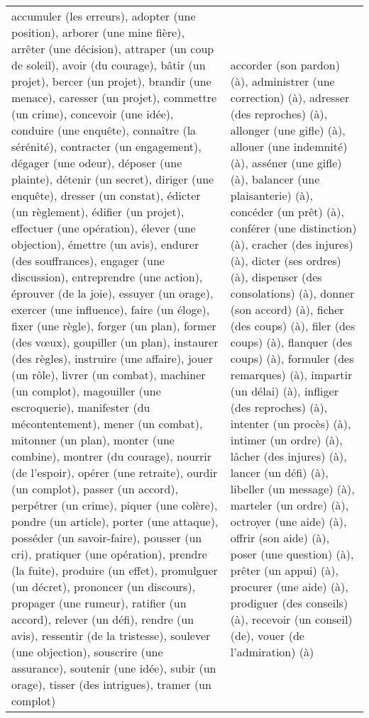 \documentclass[UTF8]{report}
\begin{document}
\begin{table}[H]
\begin{adjustbox}{max width = \textwidth}
\begin{tabular}{|>{\raggedright\arraybackslash}p{}|>{\raggedright\arraybackslash}p{}|}
            accumuler (les erreurs), adopter (une position), arborer (une mine fière), arrêter (une décision), attraper (un coup de soleil), avoir (du courage), bâtir (un projet), bercer (un projet), brandir (une menace), caresser (un projet), commettre (un crime), concevoir (une idée), conduire (une enquête), connaître (la sérénité), contracter (un engagement), dégager (une odeur), déposer (une plainte), détenir (un secret), diriger (une enquête), dresser (un constat), édicter (un règlement), édifier (un projet), effectuer (une opération), élever (une objection), émettre (un avis), endurer (des souffrances), engager (une discussion), entreprendre (une action), éprouver (de la joie), essuyer (un orage), exercer (une influence), faire (un éloge), fixer (une règle), forger (un plan), former (des vœux), goupiller (un plan), instaurer (des règles), instruire (une affaire), jouer (un rôle), livrer (un combat), machiner (un complot), magouiller (une escroquerie), manifester (du mécontentement), mener (un combat), mitonner (un plan), monter (une combine), montrer (du courage), nourrir (de l'espoir), opérer (une retraite), ourdir (un complot), passer (un accord), perpétrer (un crime), piquer (une colère), pondre (un article), porter (une attaque), posséder (un savoir-faire), pousser (un cri), pratiquer (une opération), prendre (la fuite), produire (un effet), promulguer (un décret), prononcer (un discours), propager (une rumeur), ratifier (un accord), relever (un défi), rendre (un avis), ressentir (de la tristesse), soulever (une objection), souscrire (une assurance), soutenir (une idée), subir (un orage), tisser (des intrigues), tramer (un complot) & accorder (son pardon) (à), administrer (une correction) (à), adresser (des reproches) (à), allonger (une gifle) (à), allouer (une indemnité) (à), asséner (une gifle) (à), balancer (une plaisanterie) (à), concéder (un prêt) (à), conférer (une distinction) (à), cracher (des injures) (à), dicter (ses ordres) (à), dispenser (des consolations) (à), donner (son accord) (à), ficher (des coups) (à), filer (des coups) (à), flanquer (des coups) (à), formuler (des remarques) (à), impartir (un délai) (à), infliger (des reproches) (à), intenter (un procès) (à), intimer (un ordre) (à), lâcher (des injures) (à), lancer (un défi) (à), libeller (un message) (à), marteler (un ordre) (à), octroyer (une aide) (à), offrir (son aide) (à), poser (une question) (à), prêter (un appui) (à), procurer (une aide) (à), prodiguer (des conseils) (à), recevoir (un conseil) (de), vouer (de l'admiration) (à) \\

\end{tabular}
\end{adjustbox}
\end{table}
\end{document}

